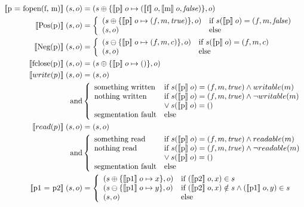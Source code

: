 \begin{align}
\llbracket \text{p = fopen(f, m)} \rrbracket \; (s,o) &= (s \oplus \{ \llbracket \text{p} \rrbracket \; o \mapsto (\llbracket \text{f} \rrbracket \; o, \llbracket \text{m} \rrbracket \; o, \mathit{false}) \}, o)\\
\llbracket \text{Pos(p)} \rrbracket \; (s,o) &= \left\{\begin{array}{ll}
	(s \oplus \{ \llbracket \text{p} \rrbracket \; o \mapsto (f, m, \mathit{true}) \}, o) & \text{if } s(\llbracket \text{p} \rrbracket \; o) = (f,m,\mathit{false})\\
	(s,o) & \text{else}
	\end{array}\right.\\
\llbracket \text{Neg(p)} \rrbracket \; (s,o) &= \left\{\begin{array}{ll}
	(s \ominus \{ \llbracket \text{p} \rrbracket \; o \mapsto (f, m, c) \}, o) & \text{if } s(\llbracket \text{p} \rrbracket \; o) = (f,m,c)\\
	(s,o) & \text{else}
	\end{array}\right.\\
\llbracket \text{fclose(p)} \rrbracket \; (s,o) &= (s \oplus \{ \llbracket \text{p} \rrbracket \; o \mapsto () \}, o)\\
\llbracket \text{$write(p)$} \rrbracket \; (s,o) &= (s,o)\\
	\text{ and}&
	\left\{\begin{array}{ll}
	\text{something written} & \text{if } s(\llbracket \text{p} \rrbracket \; o) = (f,m,\mathit{true}) \wedge writable(m)\\
	\text{nothing written} & \text{if } s(\llbracket \text{p} \rrbracket \; o) = (f,m,\mathit{true}) \wedge \neg writable(m)\\
	& \vee \: s(\llbracket \text{p} \rrbracket \; o) = ()\\
	\text{segmentation fault} & \text{else}
	\end{array}\right.\\
\llbracket \text{$read(p)$} \rrbracket \; (s,o) &= (s,o)\\
	\text{ and}&
	\left\{\begin{array}{ll}
	\text{something read} & \text{if } s(\llbracket \text{p} \rrbracket \; o) = (f,m,\mathit{true}) \wedge readable(m)\\
	\text{nothing read} & \text{if } s(\llbracket \text{p} \rrbracket \; o) = (f,m,\mathit{true}) \wedge \neg readable(m)\\
	& \vee \: s(\llbracket \text{p} \rrbracket \; o) = ()\\
	\text{segmentation fault} & \text{else}
	\end{array}\right.\\
\llbracket \text{p1 = p2} \rrbracket \; (s,o) &= \left\{\begin{array}{ll}
	(s \oplus \{ \llbracket \text{p1} \rrbracket \; o \mapsto x \}, o) & \text{if } (\llbracket \text{p2} \rrbracket \; o, x) \in s\\
	(s \ominus \{ \llbracket \text{p1} \rrbracket \; o \mapsto y \}, o) & \text{if } (\llbracket \text{p2} \rrbracket \; o, x) \notin s \wedge (\llbracket \text{p1} \rrbracket \; o, y) \in s\\
	(s,o) & \text{else}
	\end{array}\right.
\end{align}

